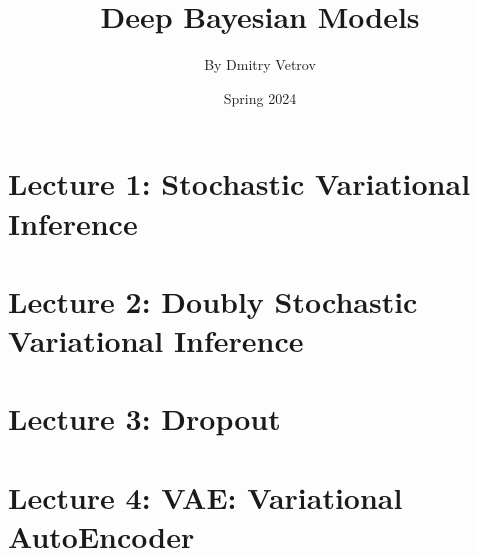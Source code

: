 \documentclass[a4paper]{article}
\title{Deep Bayesian Models}
\author{By Dmitry Vetrov}
\date{Spring 2024}
\begin{document}
\maketitle

\tableofcontents

\newpage
\setlength{\parindent}{0pt}

\section{Lecture 1: Stochastic Variational Inference}



\section{Lecture 2: Doubly Stochastic Variational Inference}



\section{Lecture 3: Dropout}



\section{Lecture 4: VAE: Variational AutoEncoder}


\end{document}
